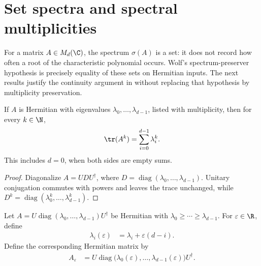 \section{Set spectra and spectral multiplicities}

For a matrix $A\in M_d(\C)$, the spectrum $\sigma(A)$ is a set: it does not
record how often a root of the characteristic polynomial occurs. Wolf's
spectrum-preserver hypothesis is precisely equality of these sets on
Hermitian inputs. The next results justify the continuity argument in
\cite[Chapter~1, Spectrum preserving maps]{Wolf2012Quantum} without replacing
that hypothesis by multiplicity preservation.

\begin{theorem}
    \label{thm:hermitian_trace_power_sum}
    \leanok
    If $A$ is Hermitian with eigenvalues $\lambda_0,\ldots,\lambda_{d-1}$,
    listed with multiplicity, then for every $k\in\N$,
    \begin{align}
        \tr(A^k)=\sum_{i=0}^{d-1}\lambda_i^k.
        \label{eq:ch01_trace_power_sum}
    \end{align}
    This includes $d=0$, when both sides are empty sums.
\end{theorem}

\begin{proof}\leanok
    Diagonalize $A=UDU^\dagger$, where
    $D=\operatorname{diag}(\lambda_0,\ldots,\lambda_{d-1})$. Unitary
    conjugation commutes with powers and leaves the trace unchanged, while
    $D^k=\operatorname{diag}(\lambda_0^k,\ldots,\lambda_{d-1}^k)$.
\end{proof}

\begin{definition}
    \label{def:hermitian_simple_spectrum_perturbation}
    \leanok
    Let $A=U\operatorname{diag}(\lambda_0,\ldots,\lambda_{d-1})U^\dagger$
    be Hermitian with $\lambda_0\ge\cdots\ge\lambda_{d-1}$. For
    $\varepsilon\in\R$, define
    \begin{align}
        \lambda_i(\varepsilon)
        &=\lambda_i+\varepsilon(d-i).
    \end{align}
    Define the corresponding Hermitian matrix by
    \begin{align}
        A_\varepsilon
        &=U\operatorname{diag}\bigl(\lambda_0(\varepsilon),\ldots,
          \lambda_{d-1}(\varepsilon)\bigr)U^\dagger.
        \label{eq:ch01_simple_perturbation}
    \end{align}
\end{definition}

